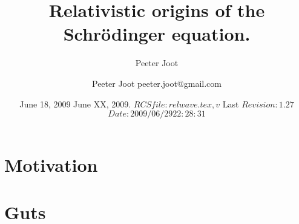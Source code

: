 \documentclass[]{eliblog}
\title{Relativistic origins of the Schr\"{o}dinger equation.}
\author{Peeter Joot}
\date{June 18, 2009}
\title{}
\author{Peeter Joot \quad peeter.joot@gmail.com }
\date{ June XX, 2009.  $RCSfile: relwave.tex,v $ Last $Revision: 1.27 $ $Date: 2009/06/29 22:28:31 $ }
\begin{document}
\maketitle{}
\tableofcontents
\section{Motivation}
\section{Guts}

%



\end{document}
